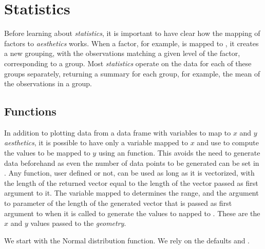 \documentclass[krantz2]{krantz}\usepackage{knitr}
\begin{document}

\section{Statistics}\label{sec:plot:statistics}

Before learning about \ggplot \emph{statistics}, it is important to have clear how the mapping of factors to \emph{aesthetics} works. When a factor, for example, is mapped to , it creates a new grouping, with the observations matching a given level of the factor, corresponding to a group. Most \emph{statistics} operate on the data for each of these groups separately, returning a summary for each group, for example, the mean of the observations in a group.

\subsection{Functions}\label{sec:plot:function}
In addition to plotting data from a data frame with variables to map to $x$ and $y$ \emph{aesthetics}, it is possible to have only a variable mapped to $x$ and use  to compute the values to be mapped to $y$ using an \Rlang function. This avoids the need to generate data beforehand as even the number of data points to be generated can be set in . Any \Rlang function, user defined or not, can be used as long as it is vectorized, with the length of the returned vector equal to the length of the vector passed as first argument to it. The variable mapped to  determines the range, and the argument to parameter  of  the length of the generated vector that is passed as first argument to  when it is called to generate the values to napped to . These are the $x$ and $y$ values passed to the \emph{geometry}.

We start with the Normal distribution function. We rely on the defaults  and .
\end{document}
